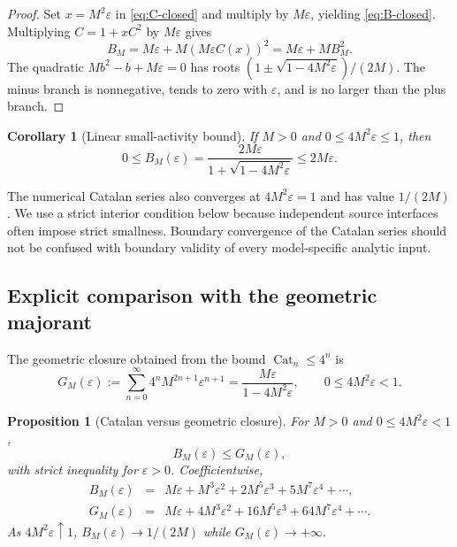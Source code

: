 \documentclass[11pt,a4paper]{article}
\newtheorem{proposition}[theorem]{Proposition}
\newtheorem{corollary}[theorem]{Corollary}
\theoremstyle{definition}
\newcommand{\Cat}{\operatorname{Cat}}
\newcommand{\eps}{\varepsilon}
\begin{document}
\begin{proof}
Set $x=M^2\eps$ in \eqref{eq:C-closed} and multiply by $M\eps$, yielding
\eqref{eq:B-closed}.  Multiplying $C=1+xC^2$ by $M\eps$ gives
\[
 B_M=M\eps+M(M\eps C(x))^2=M\eps+MB_M^2.
\]
The quadratic $Mb^2-b+M\eps=0$ has roots
$(1\pm\sqrt{1-4M^2\eps})/(2M)$.  The minus branch is nonnegative, tends to zero with
$\eps$, and is no larger than the plus branch.
\end{proof}

\begin{corollary}[Linear small-activity bound]
\label{cor:linear-B}
If $M>0$ and $0\le4M^2\eps\le1$, then
\begin{equation}
  0\le B_M(\eps)
  =\frac{2M\eps}{1+\sqrt{1-4M^2\eps}}
  \le2M\eps.
  \label{eq:B-linear}
\end{equation}
\end{corollary}

The numerical Catalan series also converges at $4M^2\eps=1$ and has value $1/(2M)$.
We use a strict interior condition below because independent source interfaces often
impose strict smallness.  Boundary convergence of the Catalan series should not be
confused with boundary validity of every model-specific analytic input.

\subsection{Explicit comparison with the geometric majorant}

The geometric closure obtained from the bound $\Cat_n\le4^n$ is
\begin{equation}
  G_M(\eps)
  :=\sum_{n=0}^{\infty}4^nM^{2n+1}\eps^{n+1}
  =\frac{M\eps}{1-4M^2\eps},
  \qquad 0\le4M^2\eps<1.
  \label{eq:G}
\end{equation}

\begin{proposition}[Catalan versus geometric closure]
\label{prop:B-vs-G}
For $M>0$ and $0\le4M^2\eps<1$,
\begin{equation}
  B_M(\eps)\le G_M(\eps),
  \label{eq:B-le-G}
\end{equation}
with strict inequality for $\eps>0$.  Coefficientwise,
\[
 \begin{array}{rcl}
 B_M(\eps)&=&M\eps+M^3\eps^2+2M^5\eps^3+5M^7\eps^4+\cdots,\\[1mm]
 G_M(\eps)&=&M\eps+4M^3\eps^2+16M^5\eps^3+64M^7\eps^4+\cdots.
 \end{array}
\]
As $4M^2\eps\uparrow1$, $B_M(\eps)\to1/(2M)$ while $G_M(\eps)\to+\infty$.
\end{proposition}
\end{document}
